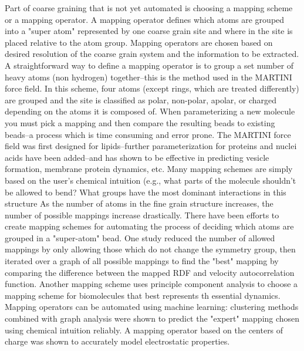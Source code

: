 Part of coarse graining that is not yet automated is choosing a mapping scheme or a mapping operator.
A mapping operator defines which atoms are grouped into a "super atom" represented by one coarse grain site and where in the site is placed relative to the atom group.
Mapping operators are chosen based on desired resolution of the coarse grain system and the information to be extracted.
A straightforward way to define a mapping operator is to group a set number of heavy atoms (non hydrogen) together--this is the method used in the MARTINI force field\cite{Marrink2007}.
In this scheme, four atoms (except rings, which are treated differently) are grouped and the site is classified as polar, non-polar, apolar, or charged depending on the atoms it is composed of.
When parameterizing a new molecule you must pick a mapping and then compare the resulting beads to existing beads--a process which is time consuming and error prone\cite{martini-tutorial}.
The MARTINI force field was first designed for lipids--further parameterization for proteins and nuclei acids have been added--and has shown to be effective in predicting vesicle formation, membrane protein dynamics, etc.%
Many mapping schemes are simply based on the user's chemical intuition (e.g., what parts of the molecule shouldn't be allowed to bend? What groups have the most dominant interactions in this structure %
As the number of atoms in the fine grain structure increases, the number of possible mappings increase drastically.
There have been efforts to create mapping schemes for automating the process of deciding which atoms are grouped in a "super-atom" bead.
One study reduced the number of allowed mappings by only allowing those which do not change the symmetry group, then iterated over a graph of all possible mappings to find the "best" mapping by comparing the difference between the mapped RDF and velocity autocorrelation function\cite{Chakraborty2018b}.
Another mapping scheme uses principle component analysis to choose a mapping scheme for biomolecules that best represents th essential dynamics\cite{Zhang2008}.
Mapping operators can be automated using machine learning: clustering methods combined with graph analysis were shown to predict the "expert" mapping chosen using chemical intuition reliably\cite{Li2020}. 
A mapping operator based on the centers of charge was shown to accurately model electrostatic properties\cite{Cao2015a}.

